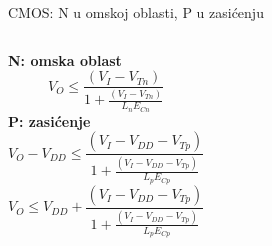 \begin{frame}[label=09_2-s031]{CMOS: N u omskoj oblasti, P u zasićenju}
\begin{columns}[T,onlytextwidth]\centering {}\textbf{N: omska oblast}\[ V_O \le \frac{(V_I-V_{Tn})}{1+\frac{(V_I-V_{Tn})}{L_nE_{Cn}}}\]
\textbf{P: zasićenje}\[ V_O-V_{DD} \le \frac{(V_I-V_{DD}-V_{Tp})}{1+\frac{(V_I-V_{DD}-V_{Tp})}{L_pE_{Cp}}}\]
\[V_O \le V_{DD}+\frac{(V_I-V_{DD}-V_{Tp})}{1+\frac{(V_I-V_{DD}-V_{Tp})}{L_pE_{Cp}}}\]
\end{columns}
\end{frame}
